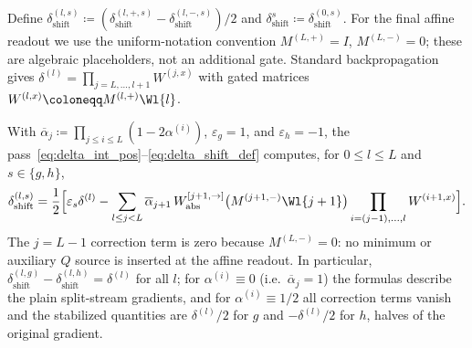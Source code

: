 Define $\delta_{\mathrm{shift}}^{(l,s)}\coloneqq(\delta_{\mathrm{shift}}^{(l,+,s)}-\delta_{\mathrm{shift}}^{(l,-,s)})/2$ and $\delta^s_{\mathrm{shift}}\coloneqq\delta_{\mathrm{shift}}^{(0,s)}$. For the final affine readout we use the uniform-notation convention $M^{(L,+)}=I$, $M^{(L,-)}=0$; these are algebraic placeholders, not an additional gate. Standard backpropagation gives $\delta^{(l)} = \prod_{j = L, \dots, l+1} W^{(j,x)}$ with gated matrices $W^{(l,x)} \coloneqq M^{(l,+)} \Wl{l}$.

\begin{theoremenv}\label{thm:closed_formula_shift}
With $\overline{\alpha}_j\coloneqq\prod_{j\le i\le L}(1-2\alpha^{(i)})$, $\varepsilon_g=1$, and $\varepsilon_h=-1$, the pass~\eqref{eq:delta_int_pos}--\eqref{eq:delta_shift_def} computes, for $0\le l\le L$ and $s\in\{g,h\}$,
\begin{equation}
\delta_{\mathrm{shift}}^{(l,s)}
=\frac12\Bigl[\varepsilon_s\delta^{(l)}-\sum_{l\le j<L}\overline{\alpha}_{j+1}\,W_{\mathrm{abs}}^{[j+1,\rightarrow]}\bigl(M^{(j+1,-)}\Wl{j+1}\bigr)\prod_{i=(j-1),\dots,l}W^{(i+1,x)}\Bigr].
\label{eq:closed_formula_g}
\end{equation}
The $j=L-1$ correction term is zero because $M^{(L,-)}=0$: no minimum or auxiliary $Q$ source is inserted at the affine readout. In particular, $\delta_{\mathrm{shift}}^{(l,g)} - \delta_{\mathrm{shift}}^{(l,h)} = \delta^{(l)}$ for all $l$; for $\alpha^{(i)} \equiv 0$ (i.e.\ $\overline{\alpha}_j = 1$) the formulas describe the plain split-stream gradients, and for $\alpha^{(i)} \equiv 1/2$ all correction terms vanish and the stabilized quantities are $\delta^{(l)}/2$ for $g$ and $-\delta^{(l)}/2$ for $h$, halves of the original gradient.\end{theoremenv}

